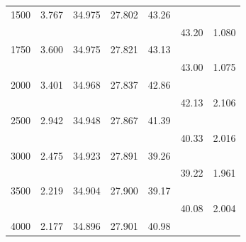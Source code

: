 \begin{table}[t!]
\begin{tabular*}{108mm}{@{}rrrrrrl}
1500&   3.767&  34.975& 27.802& 43.26&\\
 &            &       &       &       &     43.20&  1.080\\
1750&   3.600&  34.975& 27.821& 43.13&\\
 &            &       &       &       &     43.00&  1.075\\
2000&   3.401&  34.968& 27.837& 42.86&\\
 &            &       &       &       &     42.13&  2.106\\
2500&   2.942&  34.948& 27.867& 41.39&\\
 &            &       &       &       &     40.33&  2.016\\
3000&   2.475&  34.923& 27.891& 39.26&\\
 &            &       &       &       &     39.22&  1.961\\
3500&   2.219&  34.904& 27.900& 39.17&\\
 &            &       &       &       &     40.08&  2.004\\
4000&   2.177&  34.896& 27.901& 40.98\rule[-1ex]{0mm}{1ex}  \\
\hline
\end{tabular*} \\[0.5ex]
\vspace{-3ex}
\end{table}

